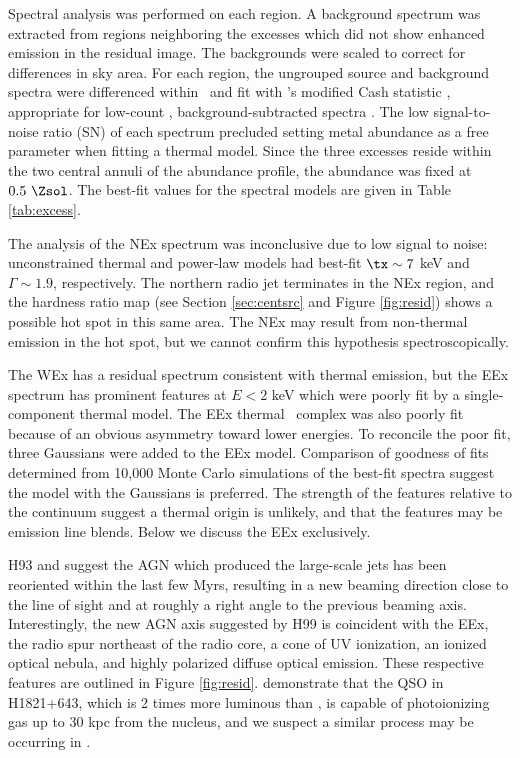 \documentclass[useAMS,usenatbib]{mn2e}
\begin{document}
Spectral analysis was performed on each region. A background spectrum
was extracted from regions neighboring the excesses which did not show
enhanced emission in the residual image. The backgrounds were scaled
to correct for differences in sky area. For each region, the ungrouped
source and background spectra were differenced within \xspec\ and fit
with \xspec's modified Cash statistic \citep{1979ApJ...228..939C},
appropriate for low-count \citep{1989ApJ...342.1207N,
  2007A&A...462..429B}, background-subtracted spectra \citep[see
  \xspec\ Manual Appendix B and][]{2004A&A...423...75V,
  2007ApJ...666..835B, 2009A&A...503...35E}. The low signal-to-noise
ratio (SN) of each spectrum precluded setting metal abundance as a
free parameter when fitting a thermal model. Since the three excesses
reside within the two central annuli of the abundance profile, the
abundance was fixed at $0.5 ~\Zsol$. The best-fit values for the
spectral models are given in Table \ref{tab:excess}.

The analysis of the NEx spectrum was inconclusive due to low signal to
noise: unconstrained thermal and power-law models had best-fit $\tx
\sim 7$ keV and $\Gamma \sim 1.9$, respectively. The northern radio
jet terminates in the NEx region, and the hardness ratio map (see
Section \ref{sec:centsrc} and Figure \ref{fig:resid}) shows a possible
hot spot in this same area. The NEx may result from non-thermal
emission in the hot spot, but we cannot confirm this hypothesis
spectroscopically.

The WEx has a residual spectrum consistent with thermal emission, but
the EEx spectrum has prominent features at $E < 2$ keV which were
poorly fit by a single-component thermal model. The EEx thermal
\feka\ complex was also poorly fit because of an obvious asymmetry
toward lower energies. To reconcile the poor fit, three Gaussians were
added to the EEx model. Comparison of goodness of fits determined from
10,000 Monte Carlo simulations of the best-fit spectra suggest the
model with the Gaussians is preferred. The strength of the features
relative to the continuum suggest a thermal origin is unlikely, and
that the features may be emission line blends. Below we discuss the
EEx exclusively.

H93 and \citet[][hereafter H99]{1999ApJ...512..145H} suggest the AGN
which produced the large-scale jets has been reoriented within the
last few Myrs, resulting in a new beaming direction close to the line
of sight and at roughly a right angle to the previous beaming
axis. Interestingly, the new AGN axis suggested by H99 is coincident
with the EEx, the radio spur northeast of the radio core, a cone of UV
ionization, an ionized optical nebula, and highly polarized diffuse
optical emission. These respective features are outlined in Figure
\ref{fig:resid}. \citet{2010MNRAS.402.1561R} demonstrate that the QSO
in H1821+643, which is 2 times more luminous than \irs, is capable of
photoionizing gas up to 30 kpc from the nucleus, and we suspect a
similar process may be occurring in \irs.
\end{document}
